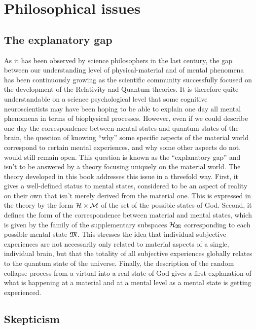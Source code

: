 \chapter{Philosophical issues}
\label{Philosophical issues}

\section{The explanatory gap}

As it has been observed by science philosophers in the last century, the gap between our understanding level of physical-material and of mental phenomena has been continuously growing as the scientific community successfully focused on the development of the Relativity and Quantum theories. It is therefore quite understandable on a science psychological level that some cognitive neuroscientists may have been hoping to be able to explain one day all mental phenomena in terms of biophysical processes. However, even if we could describe one day the correspondence between mental states and quantum states of the brain, the question of knowing ``why'' some specific aspects of the material world correspond to certain mental experiences, and why some other aspects do not, would still remain open. This question is known as the ``explanatory gap'' and isn't to be answered by a theory focusing uniquely on the material world. The theory developed in this book addresses this issue in a threefold way. First, it gives a well-defined status to mental states, considered to be an aspect of reality on their own that isn't merely derived from the material one. This is expressed in the theory by the form  $\mathcal H \times \mathcal M$ of the set of the possible states of God. Second, it defines the form of the correspondence between material and mental states, which is given by the family of the supplementary subspaces $\mathcal H_{\mathfrak{M}}$ corresponding to each possible mental state $\mathfrak{M}$. This stresses the idea that individual subjective experiences are not necessarily only related to material aspects of a single, individual brain, but that the totality of all subjective experiences globally relates to the quantum state of the universe. Finally, the description of the random collapse process from a virtual into a real state of God gives a first explanation of what is happening at a material and at a mental level as a mental state is getting experienced.

\section{Skepticism}

